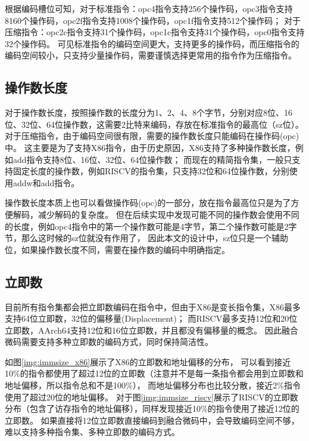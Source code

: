 根据编码槽位可知，对于标准指令：opc4指令支持256个操作码，opc3指令支持8160个操作码，opc2f指令支持1008个操作码，opc1f指令支持512个操作码；
对于压缩指令：opc2c指令支持31个操作码，opc1c指令支持31个操作码，opc0指令支持32个操作码。
可见标准指令的编码空间更大，支持更多的操作码，而压缩指令的编码空间较小，只支持少量操作码，需要谨慎选择更常用的指令作为压缩指令。

\subsection{操作数长度}
对于操作数长度，按照操作数的长度分为1、2、4、8个字节，分别对应8位、16位、32位、64位操作数，这需要2比特来编码，存放在标准指令的最高位（sz位）。
对于压缩指令，由于编码空间很有限，需要的操作数长度只能编码在操作码(opc)中。
这主要是为了支持X86指令，由于历史原因，X86支持了多种操作数长度，例如add指令支持8位、16位、32位、64位操作数；
而现在的精简指令集，一般只支持固定长度的操作数，例如RISCV的指令集，只支持32位和64位操作数，分别使用addw和add指令。

操作数长度本质上也可以看做操作码(opc)的一部分，放在指令最高位只是为了方便解码，减少解码的复杂度。
但在后续实现中发现可能不同的操作数会使用不同的长度，例如opc4指令中的第一个操作数可能是4字节，第二个操作数可能是2字节，那么这时候的sz位就没有作用了，
因此本文的设计中，sz位只是一个辅助位，如果操作数长度不同，需要在操作数的编码中明确指定。

\subsection{立即数}

目前所有指令集都会把立即数编码在指令中，但由于X86是变长指令集，X86最多支持64位立即数，32位的偏移量(Displacement)；
而RISCV最多支持12位和20位立即数，AArch64支持12位和16位立即数，并且都没有偏移量的概念。
因此融合微码需要支持多种立即数的编码方式，同时保持简洁性。

如图\ref{img:immsize_x86}展示了X86的立即数和地址偏移的分布，
可以看到接近10\%的指令都使用了超过12位的立即数（注意并不是每一条指令都会用到立即数和地址偏移，所以指令总和不是100\%），
而地址偏移分布也比较分散，接近2\%指令使用了超过20位的地址偏移。
对于图\ref{img:immsize_riscv}展示了RISCV的立即数分布（包含了访存指令的地址偏移），同样发现接近10\%的指令使用了接近12位的立即数。
如果直接将12位立即数直接编码到融合微码中，会导致编码空间不够，难以支持多种指令集、多种立即数的编码方式。

